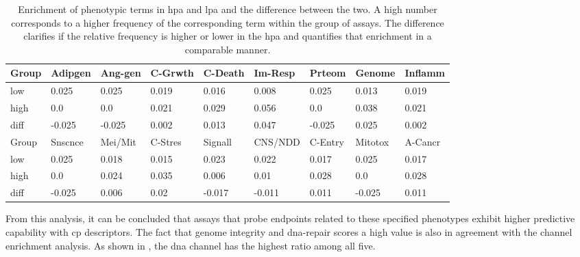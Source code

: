 \begin{table}[H]
	\footnotesize
	\centering
	\caption[Enrichment of phenotypic terms in \acl{hpa} and \acl{lpa}]{Enrichment of phenotypic terms in \acl{hpa} and \acl{lpa} and the difference between the two. A high number corresponds to a higher frequency of the corresponding term within the group of assays. The difference clarifies if the relative frequency is higher or lower in the \acl{hpa} and quantifies that enrichment in a comparable manner.}
	\label{tab:phenotypicenrichment}
	\begin{tabularx}{0.95\textwidth}{lllllllll}
		\toprule
		Group & Adipgen & Ang-gen & C-Grwth & C-Death & Im-Resp & Prteom & Genome & Inflamm\\
		\midrule
		low & 0.025 & 0.025 & 0.019 & 0.016 & 0.008 & 0.025 & 0.013 & 0.019\\
		high & 0.0 & 0.0 & 0.021 & 0.029 & 0.056 & 0.0 & 0.038 & 0.021\\
		diff & -0.025 & -0.025 & 0.002 & 0.013 & 0.047 & -0.025 & 0.025 & 0.002\\
		\midrule
		Group & Snscnce & Mei/Mit & C-Stres & Signall & CNS/NDD & C-Entry & Mitotox & A-Cancr\\
		\midrule
		low & 0.025 & 0.018 & 0.015 & 0.023 & 0.022 & 0.017 & 0.025 & 0.017\\
		high & 0.0 & 0.024 & 0.035 & 0.006 & 0.01 & 0.028 & 0.0 & 0.028\\
		diff & -0.025 & 0.006 & 0.02 & -0.017 & -0.011 & 0.011 & -0.025 & 0.011\\
		\bottomrule
	\end{tabularx}
\end{table}\noindent
From this analysis, it can be concluded that assays that probe endpoints related to these specified phenotypes exhibit higher predictive capability with \ac{cp} descriptors. The fact that genome integrity and \ac{dna}-repair scores a high value is also in agreement with the channel enrichment analysis. As shown in , the \ac{dna} channel has the highest ratio among all five.

